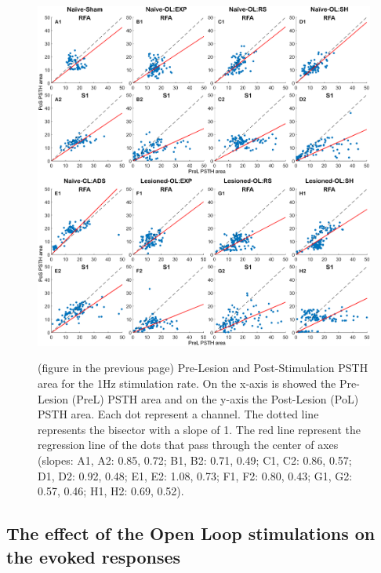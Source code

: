 \begin{figure}[htp]
    \begin{center}
    \includegraphics[width=\linewidth]{Figure/PSTH area PreL-PoS/PSTH area PreL-PoS 1Hz.jpg}
    \end{center}
\end{figure}
\begin{figure}[p!]
    \caption{(figure in the previous page) Pre-Lesion and Post-Stimulation PSTH area for the 1Hz stimulation rate. On the x-axis is showed the Pre- Lesion (PreL) PSTH area and on the y-axis the Post-Lesion (PoL) PSTH area. Each dot represent a channel. The dotted line represents the bisector with a slope of 1. The red line represent the regression line of the dots that pass through the center of axes (slopes: A1, A2: 0.85, 0.72; B1, B2: 0.71, 0.49; C1, C2: 0.86, 0.57; D1, D2: 0.92, 0.48; E1, E2: 1.08, 0.73; F1, F2: 0.80, 0.43; G1, G2: 0.57, 0.46; H1, H2: 0.69, 0.52).}
    \label{fig:PSTH area PreL-PoS 1Hz}
\end{figure}

\clearpage
\subsection{The effect of the Open Loop stimulations on the evoked responses}

